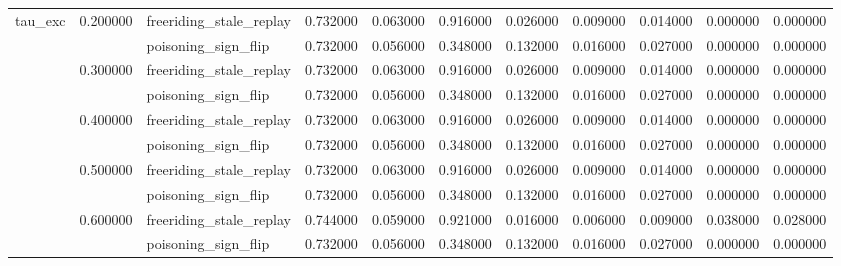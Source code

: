 \begin{tabular}{lllrrrrrrrr}
\cline{1-11} \cline{2-11}
\multirow[t]{10}{*}{tau_exc} & \multirow[t]{2}{*}{0.200000} & freeriding_stale_replay & 0.732000 & 0.063000 & 0.916000 & 0.026000 & 0.009000 & 0.014000 & 0.000000 & 0.000000 \\
 &  & poisoning_sign_flip & 0.732000 & 0.056000 & 0.348000 & 0.132000 & 0.016000 & 0.027000 & 0.000000 & 0.000000 \\
\cline{2-11}
 & \multirow[t]{2}{*}{0.300000} & freeriding_stale_replay & 0.732000 & 0.063000 & 0.916000 & 0.026000 & 0.009000 & 0.014000 & 0.000000 & 0.000000 \\
 &  & poisoning_sign_flip & 0.732000 & 0.056000 & 0.348000 & 0.132000 & 0.016000 & 0.027000 & 0.000000 & 0.000000 \\
\cline{2-11}
 & \multirow[t]{2}{*}{0.400000} & freeriding_stale_replay & 0.732000 & 0.063000 & 0.916000 & 0.026000 & 0.009000 & 0.014000 & 0.000000 & 0.000000 \\
 &  & poisoning_sign_flip & 0.732000 & 0.056000 & 0.348000 & 0.132000 & 0.016000 & 0.027000 & 0.000000 & 0.000000 \\
\cline{2-11}
 & \multirow[t]{2}{*}{0.500000} & freeriding_stale_replay & 0.732000 & 0.063000 & 0.916000 & 0.026000 & 0.009000 & 0.014000 & 0.000000 & 0.000000 \\
 &  & poisoning_sign_flip & 0.732000 & 0.056000 & 0.348000 & 0.132000 & 0.016000 & 0.027000 & 0.000000 & 0.000000 \\
\cline{2-11}
 & \multirow[t]{2}{*}{0.600000} & freeriding_stale_replay & 0.744000 & 0.059000 & 0.921000 & 0.016000 & 0.006000 & 0.009000 & 0.038000 & 0.028000 \\
 &  & poisoning_sign_flip & 0.732000 & 0.056000 & 0.348000 & 0.132000 & 0.016000 & 0.027000 & 0.000000 & 0.000000 \\
\cline{1-11} \cline{2-11}
\bottomrule
\end{tabular}
